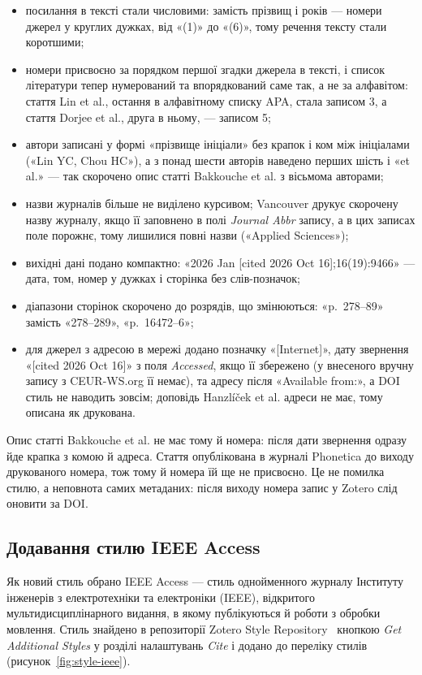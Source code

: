 \documentclass[14pt,a4paper]{extreport}
\begin{document}
\begin{itemize}
\item посилання в тексті стали числовими: замість прізвищ і років — номери джерел у круглих дужках, від «(1)» до «(6)», тому речення тексту стали коротшими;
\item номери присвоєно за порядком першої згадки джерела в тексті, і список літератури тепер нумерований та впорядкований саме так, а не за алфавітом: стаття Lin et al., остання в алфавітному списку APA, стала записом 3, а стаття Dorjee et al., друга в ньому, — записом 5;
\item автори записані у формі «прізвище ініціали» без крапок і ком між ініціалами («Lin YC, Chou HC»), а з понад шести авторів наведено перших шість і «et al.» — так скорочено опис статті Bakkouche et al. з вісьмома авторами;
\item назви журналів більше не виділено курсивом; Vancouver друкує скорочену назву журналу, якщо її заповнено в полі \textit{Journal Abbr} запису, а в цих записах поле порожнє, тому лишилися повні назви («Applied Sciences»);
\item вихідні дані подано компактно: «2026 Jan [cited 2026 Oct 16];16(19):9466» — дата, том, номер у дужках і сторінка без слів-позначок;
\item діапазони сторінок скорочено до розрядів, що змінюються: «p.~278--89» замість «278--289», «p.~16472--6»;
\item для джерел з адресою в мережі додано позначку «[Internet]», дату звернення «[cited 2026 Oct 16]» з поля \textit{Accessed}, якщо її збережено (у внесеного вручну запису з CEUR-WS.org її немає), та адресу після «Available from:», а DOI стиль не наводить зовсім; доповідь Hanzlíček et al. адреси не має, тому описана як друкована.
\end{itemize}

Опис статті Bakkouche et al. не має тому й номера: після дати звернення одразу йде крапка з комою й адреса. Стаття опублікована в журналі Phonetica до виходу друкованого номера, тож тому й номера їй ще не присвоєно. Це не помилка стилю, а неповнота самих метаданих: після виходу номера запис у Zotero слід оновити за DOI.

\subsection{Додавання стилю IEEE Access}

Як новий стиль обрано IEEE Access — стиль однойменного журналу Інституту інженерів з електротехніки та електроніки (IEEE), відкритого мультидисциплінарного видання, в якому публікуються й роботи з обробки мовлення. Стиль знайдено в репозиторії Zotero Style Repository~\cite{zotero-styles} кнопкою \textit{Get Additional Styles} у розділі налаштувань \textit{Cite} і додано до переліку стилів (рисунок~\ref{fig:style-ieee}).
\end{document}
